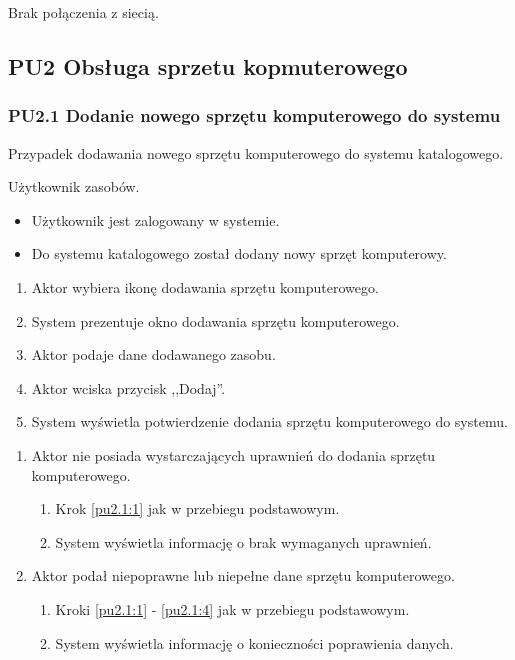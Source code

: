 Brak połączenia z siecią.



\subsection{PU2 Obsługa sprzetu kopmuterowego} \label{pu2}
\subsubsection{PU2.1 Dodanie nowego sprzętu komputerowego do systemu}

Przypadek dodawania nowego sprzętu komputerowego do systemu katalogowego.

Użytkownik zasobów.

\begin{itemize}
\item Użytkownik jest zalogowany w systemie.
\end{itemize}

\begin{itemize}
\item Do systemu katalogowego został dodany nowy sprzęt komputerowy.
\end{itemize}

\begin{enumerate}
\item \label{pu2.1:1} Aktor wybiera ikonę dodawania sprzętu komputerowego.
\item System prezentuje okno dodawania sprzętu komputerowego.
\item Aktor podaje dane dodawanego zasobu.
\item \label{pu2.1:4} Aktor wciska przycisk ,,Dodaj''.
\item System wyświetla potwierdzenie dodania sprzętu komputerowego do systemu.
\end{enumerate}

\begin{enumerate}
\item Aktor nie posiada wystarczających uprawnień do dodania sprzętu komputerowego.
	\begin{enumerate}[label*=\arabic*.]
		\item Krok \ref{pu2.1:1} jak w przebiegu podstawowym.
		\item System wyświetla informację o brak wymaganych uprawnień.
	\end{enumerate}
\item Aktor podał niepoprawne lub niepełne dane sprzętu komputerowego.
	\begin{enumerate}[label*=\arabic*.]
		\item Kroki \ref{pu2.1:1} - \ref{pu2.1:4} jak w przebiegu podstawowym.
		\item System wyświetla informację o konieczności poprawienia danych.
	\end{enumerate}
\end{enumerate}

